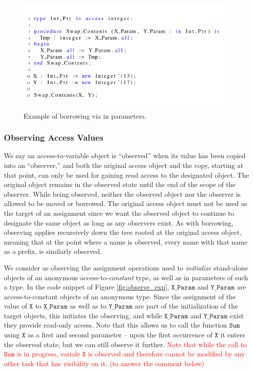 \documentclass{llncs}
\newcommand\maroua[1]{\textcolor{red}{#1}}
\newcommand\var[1]{\ensuremath{\mathtt{#1}}}
\newcommand{\keyword}[1]{\textsf{#1}}
\begin{document}
\begin{figure}[htb!]
\centering
   \includegraphics[]{borrow_ex1}
   \caption{Example of borrowing via \keyword{in} parameters.}
   \label{fig:borrow_ex1}
\end{figure}


\subsubsection{Observing Access Values}
\label{sec:observing}

We say an access-to-variable object is ``observed'' when its value has been copied into an ``observer,'' and both the original
access object and the copy, starting at that point, can only be used for gaining read access to the designated object.
The original object remains in the observed state until the end of the scope of the observer. While being observed, neither the observed object nor the observer is allowed to be moved or
borrowed. The original access object must not be used as the target of an assignment since we want the observed object to continue
to designate the same object as long as any observers exist.  As with borrowing, observing applies recursively down the tree rooted at the original access object, meaning that at the point where a name is observed,
every name with that name as a prefix, is similarly observed.


We consider as observing the assignment operations used to \textit{initialize} stand-alone objects of an anonymous access-to-\textit{constant} type, as well as \keyword{in} parameters of such a type.
In the code snippet of Figure \ref{fig:observe_exp}, \var{X\_Param} and \var{Y\_Param} are access-to-constant objects of an anonymous type. Since the assignment of the value of \var{X} to \var{X\_Param}
as well as to \var{Y\_Param} are part of the initialization of the target objects, this initiates the observing, and while \var{X\_Param} and \var{Y\_Param} exist they provide read-only access. Note that
this allows us to call the function \var{Sum} using \var{X} as a first and second parameter -- upon the first occurrence of \var{X} it enters the observed state, but we can still observe it further. 
\maroua{Note that while the call to \var{Sum} is in progress, variale \var{X} is observed and therefore cannot be modified by any other task that has visibility on it. (to answer the comment below)}
\end{document}
